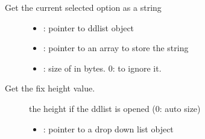 \documentclass[letterpaper,10pt,english]{sphinxmanual}
\begin{document}

\begin{fulllineitems}
\label{\detokenize{object-types/ddlist:_CPPv426lv_ddlist_get_selected_strPK8lv_obj_tPc8uint16_t}}%
\pysigstartmultiline
{}\label{\detokenize{object-types/ddlist:lv__ddlist_8h_1ae1ce1af8bc0efa700484ea5091876c7e}}%
\pysigstopmultiline
Get the current selected option as a string \begin{description}
\item[{}] \leavevmode\begin{itemize}
\item {} 
: pointer to ddlist object 

\item {} 
: pointer to an array to store the string 

\item {} 
: size of  in bytes. 0: to ignore it. 

\end{itemize}

\end{description}


\end{fulllineitems}


\begin{fulllineitems}
\label{\detokenize{object-types/ddlist:_CPPv424lv_ddlist_get_fix_heightPK8lv_obj_t}}%
\pysigstartmultiline
{}\label{\detokenize{object-types/ddlist:lv__ddlist_8h_1ad63b3ca4e4bf53b5c0e1d8ea4e8f5a44}}%
\pysigstopmultiline
Get the fix height value. \begin{description}
\item[{}] \leavevmode
the height if the ddlist is opened (0: auto size) 

\item[{}] \leavevmode\begin{itemize}
\item {} 
: pointer to a drop down list object 

\end{itemize}

\end{description}


\end{fulllineitems}
\end{document}
